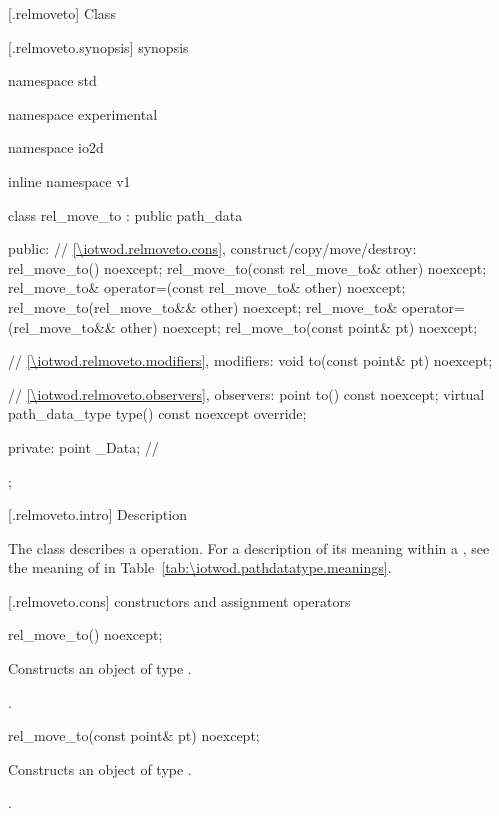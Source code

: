  [\iotwod.relmoveto] {Class }

 [\iotwod.relmoveto.synopsis] { synopsis}

\begin{codeblock}
namespace std { namespace experimental { namespace io2d { inline namespace v1 {
  class rel_move_to : public path_data {
  public:
    // \ref{\iotwod.relmoveto.cons}, construct/copy/move/destroy:
    rel_move_to() noexcept;
    rel_move_to(const rel_move_to& other) noexcept;
    rel_move_to& operator=(const rel_move_to& other) noexcept;
    rel_move_to(rel_move_to&& other) noexcept;
    rel_move_to& operator=(rel_move_to&& other) noexcept;
    rel_move_to(const point& pt) noexcept;

    // \ref{\iotwod.relmoveto.modifiers}, modifiers:
    void to(const point& pt) noexcept;

    // \ref{\iotwod.relmoveto.observers}, observers:
    point to() const noexcept;
    virtual path_data_type type() const noexcept override;
    
  private:
    point _Data; // \expos
  };
} } } }
\end{codeblock}

 [\iotwod.relmoveto.intro] { Description}

\pnum
{}
The class  describes a  operation. For a description of its meaning within a , see the meaning of  in Table~\ref{tab:\iotwod.pathdatatype.meanings}.

 [\iotwod.relmoveto.cons] { constructors and assignment operators}

\begin{itemdecl}
    rel_move_to() noexcept;
\end{itemdecl}
\begin{itemdescr}
	\pnum
	\effects
	Constructs an object of type .
	
	\pnum
	\postconditions
	.
\end{itemdescr}

\begin{itemdecl}
    rel_move_to(const point& pt) noexcept;
\end{itemdecl}
\begin{itemdescr}
	\pnum
	\effects
	Constructs an object of type .
	
	\pnum
	\postconditions
	.
\end{itemdescr}

